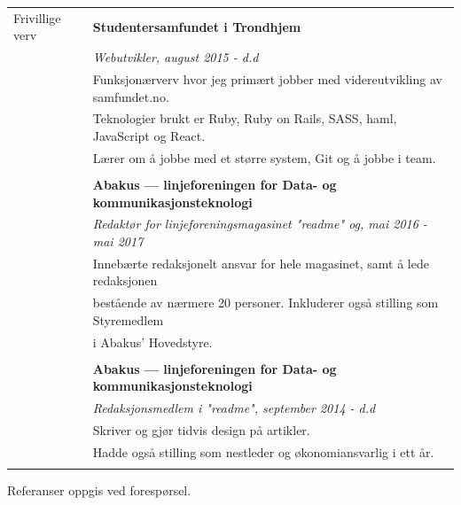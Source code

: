 \documentclass[letterpaper,10pt,oneside]{article}
\begin{document}
\begin{longtable}{@{} l l}
 \Large{Frivillige verv}    & \textbf{Studentersamfundet i Trondhjem} \\
 & \textit{Webutvikler, august 2015 - d.d}\\
     & Funksjonærverv hvor jeg primært jobber med videreutvikling av samfundet.no. \\
     & Teknologier brukt er Ruby, Ruby on Rails, SASS, haml, JavaScript og React. \\
     & Lærer om å jobbe med et større system, Git og å jobbe i team.\\
     & \\
     & \textbf{Abakus --- linjeforeningen for Data- og kommunikasjonsteknologi} \\
     & \textit{Redaktør for linjeforeningsmagasinet "readme" og, mai 2016 - mai 2017}\\
     & Innebærte redaksjonelt ansvar for hele magasinet, samt å lede redaksjonen \\
     & bestående av nærmere 20 personer. Inkluderer også stilling som Styremedlem \\
     & i Abakus' Hovedstyre. \\
     & \\
     & \textbf{Abakus --- linjeforeningen for Data- og kommunikasjonsteknologi} \\
     & \textit{Redaksjonsmedlem i "readme", september 2014 - d.d}\\
     & Skriver og gjør tidvis design på artikler. \\
     & Hadde også stilling som nestleder og økonomiansvarlig i ett år.\\
     & \\

\end{longtable}

Referanser oppgis ved forespørsel.
\end{document}
